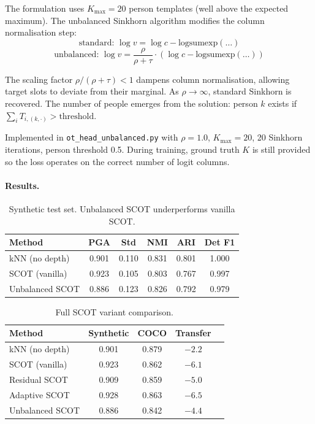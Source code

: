 The formulation uses $K_{\max} = 20$ person templates (well above the expected maximum). The unbalanced Sinkhorn algorithm modifies the column normalisation step:
\[
\text{standard: } \log v = \log c - \text{logsumexp}(\ldots)
\]
\[
\text{unbalanced: } \log v = \frac{\rho}{\rho + \tau} \cdot (\log c - \text{logsumexp}(\ldots))
\]

The scaling factor $\rho / (\rho + \tau) < 1$ dampens column normalisation, allowing target slots to deviate from their marginal. As $\rho \to \infty$, standard Sinkhorn is recovered. The number of people emerges from the solution: person $k$ exists if $\sum_i T_{i,(k,\cdot)} > \text{threshold}$.

Implemented in \texttt{ot\_head\_unbalanced.py} with $\rho = 1.0$, $K_{\max} = 20$, 20 Sinkhorn iterations, person threshold 0.5. During training, ground truth $K$ is still provided so the loss operates on the correct number of logit columns.


\paragraph{Results.}

\begin{table}[H]
\centering
\footnotesize
\begin{tabular}{lccccc}
\toprule
Method & PGA & Std & NMI & ARI & Det F1 \\
\midrule
kNN (no depth) & 0.901 & 0.110 & 0.831 & 0.801 & 1.000 \\
SCOT (vanilla) & 0.923 & 0.105 & 0.803 & 0.767 & 0.997 \\
Unbalanced SCOT & 0.886 & 0.123 & 0.826 & 0.792 & 0.979 \\
\bottomrule
\end{tabular}
\caption{Synthetic test set. Unbalanced SCOT underperforms vanilla SCOT.}
\end{table}

\begin{table}[H]
\centering
\footnotesize
\begin{tabular}{lcccc}
\toprule
Method & Synthetic & COCO & Transfer \\
\midrule
kNN (no depth) & 0.901 & 0.879 & $-2.2$ \\
SCOT (vanilla) & 0.923 & 0.862 & $-6.1$ \\
Residual SCOT & 0.909 & 0.859 & $-5.0$ \\
Adaptive SCOT & 0.928 & 0.863 & $-6.5$ \\
Unbalanced SCOT & 0.886 & 0.842 & $-4.4$ \\
\bottomrule
\end{tabular}
\caption{Full SCOT variant comparison.}
\end{table}

